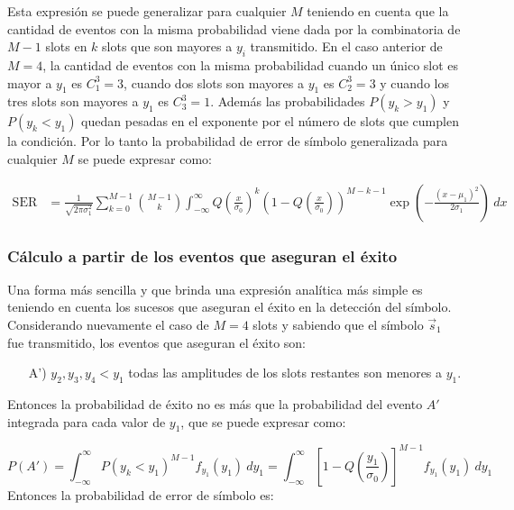 \documentclass{article}
\begin{document}
            Esta expresión se puede generalizar para cualquier $M$ teniendo en cuenta que la cantidad de eventos con la misma probabilidad 
            viene dada por la combinatoria de $M-1$ slots en $k$ slots que son mayores a $y_i$ transmitido. En el caso anterior de $M=4$, 
            la cantidad de eventos con la misma probabilidad cuando un único slot es mayor a $y_1$ es $C_1^3=3$, cuando dos slots son mayores a $y_1$
            es $C_2^3=3$ y cuando los tres slots son mayores a $y_1$ es $C_3^3=1$. Además las probabilidades $P(y_k>y_1)$ y $P(y_k<y_1)$
            quedan pesadas en el exponente por el número de slots que cumplen la condición. Por lo tanto la probabilidad de error de símbolo generalizada 
            para cualquier $M$ se puede expresar como:
            \begin{tcolorbox}[colback=yellow!20!white,colframe=black]
                \begin{align}
                    \text{SER} &= \frac{1}{\sqrt{2\pi\sigma_1^2}} \sum_{k=0}^{M-1} \binom{M-1}{k}\int_{-\infty}^{\infty} Q\left( \frac{x}{\sigma_0} \right)^k \left(1-Q\left( \frac{x}{\sigma_0} \right)\right)^{M-k-1} \exp\left(-\frac{(x-\mu_1)^2}{2\sigma_1}\right)\:dx 
                \end{align}
            \end{tcolorbox}
            
        \subsubsection{Cálculo a partir de los eventos que aseguran el éxito}
            Una forma más sencilla y que brinda una expresión analítica más simple es teniendo en cuenta 
            los sucesos que aseguran el éxito en la detección del símbolo. Considerando nuevamente el caso
            de $M=4$ slots y sabiendo que el símbolo $\vec{s}_1$ fue transmitido, los eventos que aseguran el éxito son:
            
            \begin{itemize}
                \item[A')] $y_2,y_3,y_4 < y_1$ todas las amplitudes de los slots restantes son menores a $y_1$. 
            \end{itemize}
            Entonces la probabilidad de éxito no es más que la probabilidad del evento $A'$ integrada para cada valor de $y_1$, que se puede expresar como:
            
            \begin{equation}
                P(A') = \int_{-\infty}^{\infty}P(y_k<y_1)^{M-1} f_{y_1}(y_1)\:dy_1 = \int_{-\infty}^{\infty}\left[1-Q\left( \frac{y_1}{\sigma_0} \right)\right]^{M-1}f_{y_1}(y_1)\:dy_1
            \end{equation}
            Entonces la probabilidad de error de símbolo es:
            
\end{document}
